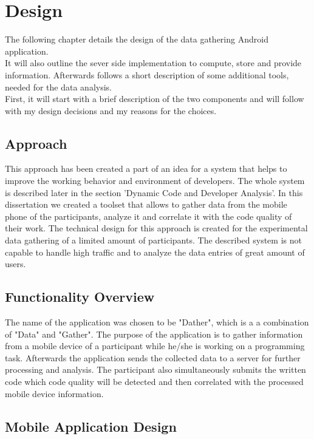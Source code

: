 \chapter{Design}

The following chapter details the design of the data gathering Android application.\\ 
It will also outline the sever side implementation to compute, store and provide information. Afterwards follows a short description of some additional tools, needed for the data analysis.\\
First, it will start with a brief description of the two components and will follow with my design decisions and my reasons for the choices. 

\section{Approach}
This approach has been created a part of an idea for a system that helps to improve the working behavior and environment of developers. The whole system is described later in the section 'Dynamic Code and Developer Analysis'.
In this dissertation we created a toolset that allows to gather data from the mobile phone of the participants, analyze it and correlate it with the code quality of their work. The technical design for this approach is created for the experimental data gathering of a limited amount of participants. The described system is not capable to handle high traffic and to analyze the data entries of great amount of users. 

\section{Functionality Overview}
The name of the application was chosen to be "Dather", which is a a combination of "Data" and "Gather".
The purpose of the application is to gather information from a mobile device of a participant while he/she is working on a programming task. Afterwards the application sends the collected data to a server for further processing and analysis. The participant also simultaneously submits the written code which code quality will be detected and then correlated with the processed mobile device information. 

\section{Mobile Application Design}

